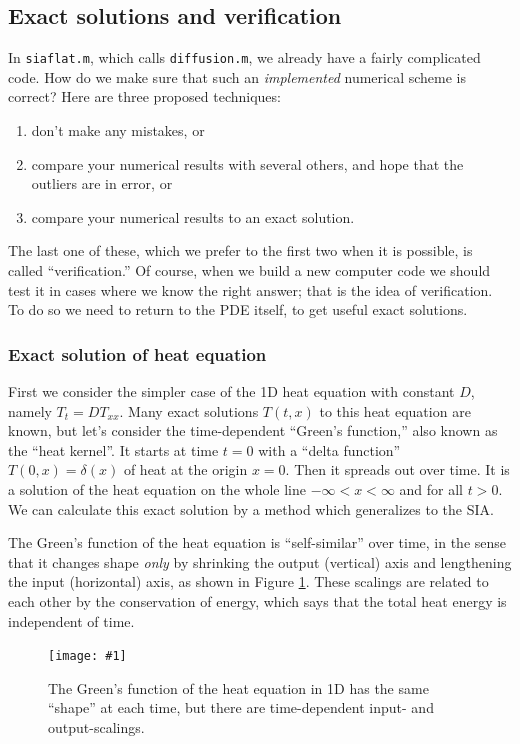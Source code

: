 \documentclass[letterpaper,final,12pt,reqno]{amsart}
\newcommand{\minput}[1]{
\vspace{0.8cm}
\VerbatimInput[frame=single,framesep=3mm,label=\fbox{\normalsize \textsl{\,#1.m\,}},fontfamily=courier,fontsize=\footnotesize]{../mfiles/#1.slim.m}
\vspace{0.5cm}
}
\newcommand{\onefigsize}[3]{
\begin{figure}[ht]
\centering
\texttt{[image: \#1]}
\caption{#2}
\label{fig:#1}
\end{figure}}
\begin{document}
\minput{siaflat}


\subsection{Exact solutions and verification}

In \texttt{siaflat.m}, which calls \texttt{diffusion.m}, we already have a fairly complicated code.  How do we make sure that such an \emph{implemented} numerical scheme is correct?  Here are three proposed techniques:
\begin{enumerate}
  \item don't make any mistakes, or
  \item compare your numerical results with several others, and hope that the outliers are in error, or
  \item compare your numerical results to an exact solution.   \end{enumerate}
The last one of these, which we prefer to the first two when it is possible, is called ``verification.''  Of course, when we build a new computer code we should test it in cases where we know the right answer; that is the idea of verification.  To do so we need to return to the PDE itself, to get useful exact solutions.

\subsubsection*{Exact solution of heat equation}  First we consider the simpler case of the 1D heat equation with constant $D$, namely $T_t = D T_{xx}$.  Many exact solutions $T(t,x)$ to this heat equation are known, but let's consider the time-dependent ``Green's function,'' also known as the ``heat kernel''.  It starts at time $t=0$ with a ``delta function'' $T(0,x)=\delta(x)$ of heat at the origin $x=0$.  Then it spreads out over time.  It is a solution of the heat equation on the whole line $-\infty<x<\infty$ and for all $t>0$.  We can calculate this exact solution by a method which generalizes to the SIA.

The Green's function of the heat equation is ``self-similar'' over time, in the sense that it changes shape \emph{only} by shrinking the output (vertical) axis and lengthening the input (horizontal) axis, as shown in Figure \ref{fig:heatscaling}.  These scalings are related to each other by the conservation of energy, which says that the total heat energy is independent of time.

\onefigsize{heatscaling}{The Green's function of the heat equation in 1D has the same ``shape'' at each time, but there are time-dependent input- and output-scalings.}{2.4in}
\end{document}
